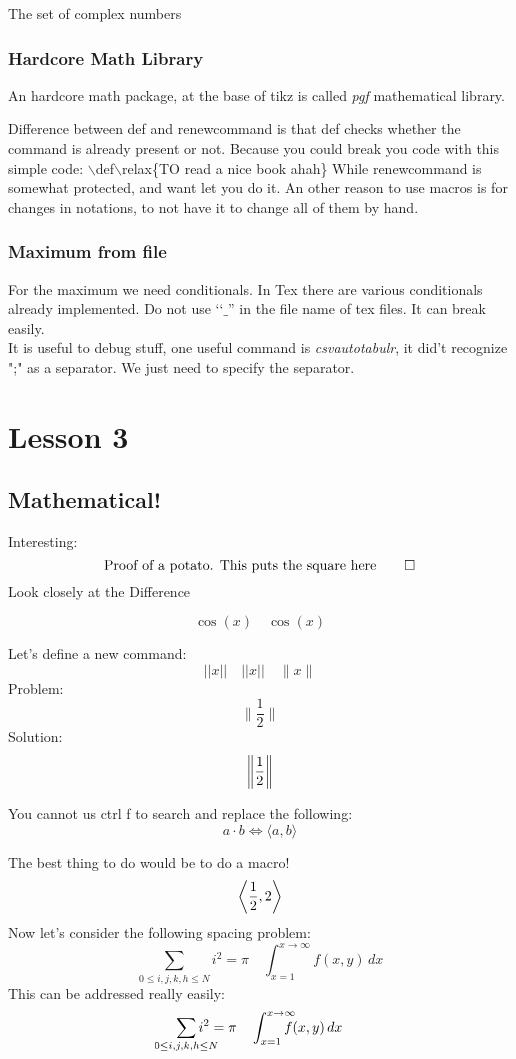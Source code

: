 \documentclass[11pt,a4paper,oneside,openany]{book}
\newcommand\normone[1]{|| #1 ||} %
\newcommand\normtwo[1]{\vert\vert #1 \vert\vert} %
\newcommand\normthree[1]{\lVert #1\rVert} %
\DeclarePairedDelimiter{\norm}{\lVert}{\rVert}
\DeclarePairedDelimiter{\angular}{\langle}{\rangle}
\newcommand\innerprod[2]{\angular*{#1,#2}}
\begin{document}
The set of complex numbers %

\subsection{Hardcore Math Library}
An hardcore math package, at the base of tikz is called \emph{pgf} mathematical library.


Difference between def and renewcommand is that def checks whether the command is already present or not.
Because you could break you code with this simple code: 
\(\backslash\)def\(\backslash\)relax\{TO read a nice book ahah\}
While renewcommand is somewhat protected, and want let you do it. An other reason to use macros is for changes in notations, to not have it to change all of them by hand.

\subsection{Maximum from file}
For the maximum we need conditionals. In Tex there are various conditionals already implemented.
Do not use \lq\lq\(\_ \)'' in the file name of tex files. It can break easily. \\ It is useful to debug stuff, one useful command is \emph{csvautotabulr}, it did't recognize ";" as a separator. We just need to specify the separator.



\chapter{Lesson 3}
\section{Mathematical!}
Interesting: 
\[
\text{Proof of a potato. This puts the square here} \hfill \qed    
\]
Look closely at the Difference
\begin{Huge}
\[
\cos(x)  \quad \cos \left( x \right)   
\]
\end{Huge}
Let's define a new command:
\[
\normone{x} \quad \normtwo{x} \quad \normthree{x}
\]
Problem:
\[
    \normthree{\frac12}\]
Solution:
\[
    \norm*{\frac12}\]

You cannot us ctrl f to search and replace the following:
\[
    a \cdot b \iff \langle a,b \rangle\]


The best thing to do would be to do a macro!
\[
    \innerprod{\frac12}{2}
    \]
Now let's consider the following spacing problem:
\[
    \sum_{0 \le i,j,k,h \le N} i^2 = \pi \quad \int_{x=1}^{x \to \infty}f(x,y)\,dx\]
This can be addressed really easily:
\[
    \sum_{\mathclap{0 \le i,j,k,h \le N}} i^2 = \pi \quad \int_{x=1}^{\mathrlap{x \to \infty}}f(x,y)\,dx
\]
\end{document}
